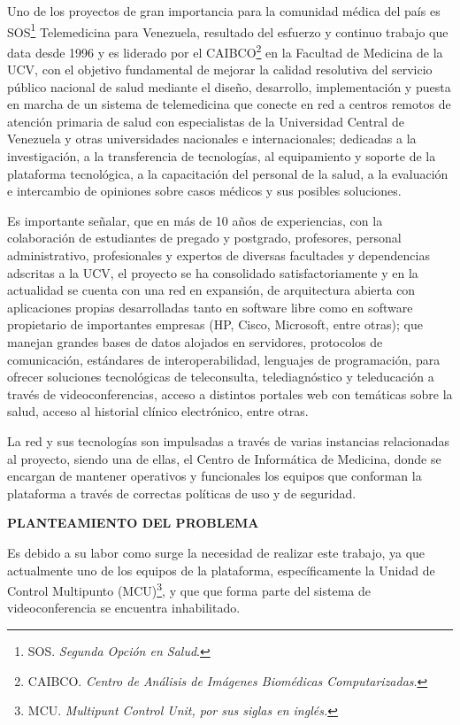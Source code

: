 \documentclass[12pt,letterpaper]{article}
\begin{document}
Uno de los proyectos de gran importancia para la comunidad médica del país es SOS\footnote{SOS. \emph{Segunda Opción en Salud}.} Telemedicina para Venezuela, resultado del esfuerzo y continuo trabajo que data desde 1996 y es liderado por el CAIBCO\footnote{CAIBCO. \emph{Centro de Análisis de Imágenes Biomédicas Computarizadas}.} en la Facultad de Medicina de la UCV, con el objetivo fundamental de mejorar la calidad resolutiva del servicio público nacional de salud mediante el diseño, desarrollo, implementación y puesta en marcha de un sistema de telemedicina que conecte en red a centros remotos de atención primaria de salud con especialistas de la Universidad Central de Venezuela y otras universidades nacionales e internacionales; dedicadas a la investigación, a la transferencia de tecnologías, al equipamiento y soporte de la plataforma tecnológica, a la capacitación del personal de la salud, a la evaluación e intercambio de opiniones sobre casos médicos y sus posibles soluciones. 

Es importante señalar, que en más de 10 años de experiencias, con la colaboración de estudiantes de pregado y postgrado, profesores, personal administrativo, profesionales y expertos de diversas facultades y dependencias adscritas a la UCV, el proyecto se ha consolidado satisfactoriamente y en la actualidad se cuenta con una red en expansión, de arquitectura abierta con aplicaciones propias desarrolladas tanto en software libre como en software propietario de importantes empresas (HP, Cisco, Microsoft, entre otras); que manejan grandes bases de datos alojados en servidores, protocolos de comunicación, estándares de interoperabilidad, lenguajes de programación, para ofrecer soluciones tecnológicas de teleconsulta, telediagnóstico y teleducación a través de videoconferencias, acceso a distintos portales web con temáticas sobre la salud, acceso al historial clínico electrónico, entre otras. 

La red y sus tecnologías son impulsadas a través de varias instancias relacionadas al proyecto, siendo una de ellas, el Centro de Informática de Medicina, donde se encargan de mantener operativos y funcionales los equipos que conforman la plataforma a través de correctas políticas de uso y de seguridad. 
   
\centerline{\textbf{PLANTEAMIENTO DEL PROBLEMA}}


Es debido a su labor como surge la necesidad de realizar este trabajo, ya que actualmente uno de los equipos de la plataforma, específicamente la Unidad de Control Multipunto (MCU)\footnote{MCU. \emph{Multipunt Control Unit, por sus siglas en inglés.}}, y que que forma parte del sistema de videoconferencia se encuentra inhabilitado.
\end{document}
